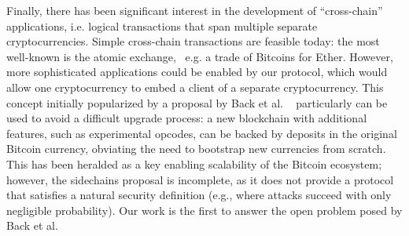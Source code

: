   Finally, there has been significant interest in the development of ``cross-chain'' applications, i.e. logical transactions that span multiple separate cryptocurrencies.
  Simple cross-chain transactions are feasible today: the most well-known is the atomic exchange,~\cite{tiernolan} e.g. a trade of Bitcoins for Ether.
  However, more sophisticated applications could be enabled by our protocol, which would allow one cryptocurrency to embed a client of a separate cryptocurrency.
  This concept initially popularized by a proposal by Back et al.
  ~\cite{sidechains} particularly can be used to avoid a difficult upgrade
  process: a new blockchain with additional features, such as experimental
  opcodes, can be backed by deposits in the original Bitcoin currency, obviating the need to bootstrap new currencies from scratch.
  This has been heralded as a key enabling scalability of the Bitcoin ecosystem;
  however, the sidechains proposal is incomplete, as it does not provide a protocol that satisfies a natural security definition (e.g., where attacks succeed with only negligible probability). Our work is the first to answer the open problem posed by Back et al.

\noindent
